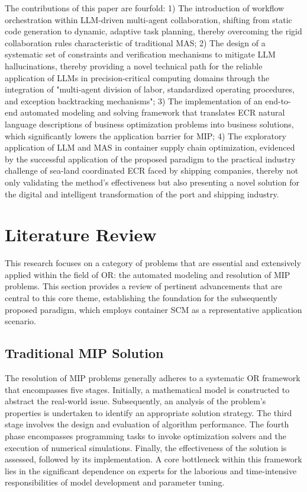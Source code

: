 \documentclass[preprint,12pt]{elsarticle}
\begin{document}
The contributions of this paper are fourfold: 1) The introduction of workflow orchestration within LLM-driven multi-agent collaboration, shifting from static code generation to dynamic, adaptive task planning, thereby overcoming the rigid collaboration rules characteristic of traditional MAS; 2) The design of a systematic set of constraints and verification mechanisms to mitigate LLM hallucinations, thereby providing a novel technical path for the reliable application of LLMs in precision-critical computing domains through the integration of "multi-agent division of labor, standardized operating procedures, and exception backtracking mechanisms"; 3) The implementation of an end-to-end automated modeling and solving framework that translates ECR natural language descriptions of business optimization problems into business solutions, which significantly lowers the application barrier for MIP; 4) The exploratory application of LLM and MAS in container supply chain optimization, evidenced by the successful application of the proposed paradigm to the practical industry challenge of sea-land coordinated ECR faced by shipping companies, thereby not only validating the method's effectiveness but also presenting a novel solution for the digital and intelligent transformation of the port and shipping industry.


\section{Literature Review}
This research focuses on a category of problems that are essential and extensively applied within the field of OR: the automated modeling and resolution of MIP problems. This section provides a review of pertinent advancements that are central to this core theme, establishing the foundation for the subsequently proposed paradigm, which employs container SCM as a representative application scenario.

\subsection{Traditional MIP Solution}
The resolution of MIP problems generally adheres to a systematic OR framework that encompasses five stages. Initially, a mathematical model is constructed to abstract the real-world issue. Subsequently, an analysis of the problem's properties is undertaken to identify an appropriate solution strategy. The third stage involves the design and evaluation of algorithm performance. The fourth phase encompasses programming tasks to invoke optimization solvers and the execution of numerical simulations. Finally, the effectiveness of the solution is assessed, followed by its implementation. A core bottleneck within this framework lies in the significant dependence on experts for the laborious and time-intensive responsibilities of model development and parameter tuning.
\end{document}
